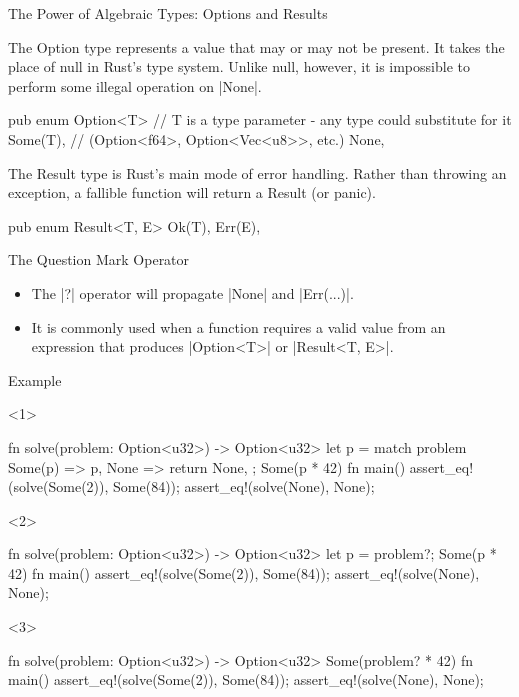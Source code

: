 \documentclass[8pt, aspectratio=169]{beamer}
\begin{document}
{\begin{frame}[fragile]{The Power of Algebraic Types: Options and Results}
\begin{definition}[Option]
The Option type represents a value that may or may not be present. It takes the place of null in Rust's type system. Unlike null, however, it is impossible to perform some illegal operation on \rustinline|None|.
\begin{rustcode}
pub enum Option<T> { // T is a type parameter - any type could substitute for it
    Some(T),         // (Option<f64>, Option<Vec<u8>>, etc.)
    None,
}
\end{rustcode}
\end{definition}
\begin{definition}[Result]
The Result type is Rust's main mode of error handling. Rather than throwing an exception, a fallible function will return a Result (or panic).
\begin{rustcode}
pub enum Result<T, E> {
   Ok(T),
   Err(E),
}
\end{rustcode}
\end{definition}
\end{frame}

\begin{frame}[fragile]{The Question Mark Operator}
\begin{itemize}
\item The \rustinline|?| operator will propagate \rustinline|None| and \rustinline|Err(...)|.
\item It is commonly used when a function requires a valid value from an expression that produces \rustinline|Option<T>| or \rustinline|Result<T, E>|.
\end{itemize}
\begin{exampleblock}{Example}
\begin{onlyenv}<1>
\begin{rustcode}
fn solve(problem: Option<u32>) -> Option<u32> {
    let p = match problem {
        Some(p) => p,
        None => return None,
    }; 
    Some(p * 42)
} 
fn main() {
    assert_eq!(solve(Some(2)), Some(84));
    assert_eq!(solve(None), None);
}
\end{rustcode}
\end{onlyenv}
\begin{onlyenv}<2>
\begin{rustcode}
fn solve(problem: Option<u32>) -> Option<u32> {
    let p = problem?;
    Some(p * 42)
}
fn main() {
    assert_eq!(solve(Some(2)), Some(84));
    assert_eq!(solve(None), None);
}
\end{rustcode}
\end{onlyenv}
\begin{onlyenv}<3>
\begin{rustcode}
fn solve(problem: Option<u32>) -> Option<u32> {
    Some(problem? * 42)
}
fn main() {
    assert_eq!(solve(Some(2)), Some(84));
    assert_eq!(solve(None), None);
}
\end{rustcode}
\end{onlyenv}
\end{exampleblock}
\end{frame}

}
\end{document}
